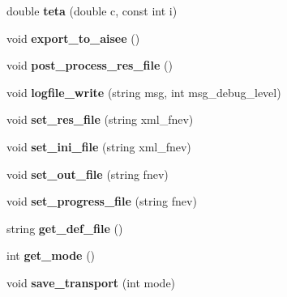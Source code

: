 \begin{DoxyCompactItemize}
\item 
double {\bfseries teta} (double c, const int i)\hypertarget{class_staci_a2ae0957cb2159f7417175379bac09d95}{}\label{class_staci_a2ae0957cb2159f7417175379bac09d95}

\item 
void {\bfseries export\+\_\+to\+\_\+aisee} ()\hypertarget{class_staci_a7c79de7b27f86ef08e48eef757e895fa}{}\label{class_staci_a7c79de7b27f86ef08e48eef757e895fa}

\item 
void {\bfseries post\+\_\+process\+\_\+res\+\_\+file} ()\hypertarget{class_staci_ac0af3f19c34f3a08e4892cebdc5e0340}{}\label{class_staci_ac0af3f19c34f3a08e4892cebdc5e0340}

\item 
void {\bfseries logfile\+\_\+write} (string msg, int msg\+\_\+debug\+\_\+level)\hypertarget{class_staci_af0d4816a00fec9373f469a7854f09a0e}{}\label{class_staci_af0d4816a00fec9373f469a7854f09a0e}

\item 
void {\bfseries set\+\_\+res\+\_\+file} (string xml\+\_\+fnev)\hypertarget{class_staci_a03c12265bef1640238ffe1efdb0a2556}{}\label{class_staci_a03c12265bef1640238ffe1efdb0a2556}

\item 
void {\bfseries set\+\_\+ini\+\_\+file} (string xml\+\_\+fnev)\hypertarget{class_staci_a2939f5a02b2d06e21be553d31a15106c}{}\label{class_staci_a2939f5a02b2d06e21be553d31a15106c}

\item 
void {\bfseries set\+\_\+out\+\_\+file} (string fnev)\hypertarget{class_staci_a80220c0c3baa490866bd2fc15698a8d1}{}\label{class_staci_a80220c0c3baa490866bd2fc15698a8d1}

\item 
void {\bfseries set\+\_\+progress\+\_\+file} (string fnev)\hypertarget{class_staci_a00500602fabd3f2cdc0bd7fedc845787}{}\label{class_staci_a00500602fabd3f2cdc0bd7fedc845787}

\item 
string {\bfseries get\+\_\+def\+\_\+file} ()\hypertarget{class_staci_a61dc8ef1b4e1561938e6cc39917b346f}{}\label{class_staci_a61dc8ef1b4e1561938e6cc39917b346f}

\item 
int {\bfseries get\+\_\+mode} ()\hypertarget{class_staci_a0c822a9effbcf4dd88b82f68b38c0498}{}\label{class_staci_a0c822a9effbcf4dd88b82f68b38c0498}

\item 
void {\bfseries save\+\_\+transport} (int mode)\hypertarget{class_staci_a9c1d34d2dc05eaad3c5ba60d5ebfa5a1}{}\label{class_staci_a9c1d34d2dc05eaad3c5ba60d5ebfa5a1}


\end{DoxyCompactItemize}
